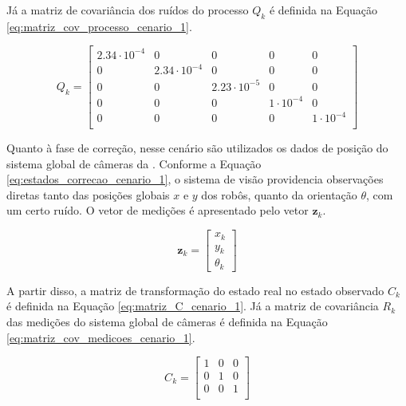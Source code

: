 \documentclass[acronym, symbols, table, deposito]{fei}
\begin{document}
		 	Já a matriz de covariância dos ruídos do processo $Q_{k}$ é definida na Equação \eqref{eq:matriz_cov_processo_cenario_1}.
		 	
		 	\begin{equation}\label{eq:matriz_cov_processo_cenario_1}
		 		Q_{k} = \begin{bmatrix}
		 			2.34\cdot10^{-4} & 0 & 0 & 0 & 0 \\
		 			0 & 2.34\cdot10^{-4} & 0 & 0 & 0 \\
		 			0 & 0 & 2.23\cdot10^{-5} & 0 & 0 \\
		 			0 & 0 & 0 & 1\cdot10^{-4} & 0 \\
		 			0 & 0 & 0 & 0 & 1\cdot10^{-4} \\
		 		\end{bmatrix}
		 	\end{equation}
		 
			 Quanto à fase de correção, nesse cenário são utilizados os dados de posição do sistema global de câmeras da . Conforme a Equação \eqref{eq:estados_correcao_cenario_1}, o sistema de visão providencia observações diretas tanto das posições globais $x$ e $y$ dos robôs, quanto da orientação $\theta$, com um certo ruído. O vetor de medições é apresentado pelo vetor $\textbf{z}_k$.
			 
	 		\begin{equation}\label{eq:estados_correcao_cenario_1}
			 	\textbf{z}_k  = 
			 	\begin{bmatrix}
			 		x_k \\
			 		y_k \\
			 		\theta_k
			 	\end{bmatrix}
			\end{equation}
		 
		 	A partir disso, a matriz de transformação do estado real no estado observado $C_k$ é definida na Equação \eqref{eq:matriz_C_cenario_1}. Já a matriz de covariância $R_{k}$ das medições do sistema global de câmeras é definida na Equação \eqref{eq:matriz_cov_medicoes_cenario_1}.
			 
			\begin{equation}\label{eq:matriz_C_cenario_1}
			 	C_{k} = \begin{bmatrix}
			 		1 & 0 & 0 \\
			 		0 & 1 & 0 \\
			 		0 & 0 & 1 \\
			 	\end{bmatrix}
		 	\end{equation}
	 	
\end{document}
